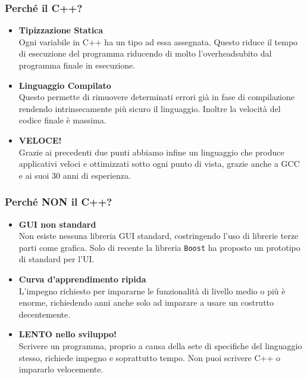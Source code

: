\documentclass[11pt]{beamer}
\begin{document}
\begin{frame}
\frametitle{Perché il C++?}
\begin{itemize}
	\pause
	\item \textbf{Tipizzazione Statica}\\
	Ogni variabile in C++ ha un tipo ad essa assegnata. Questo riduce il tempo di esecuzione del programma riducendo di molto l'overhead\footnotemark subito dal programma finale in esecuzione.
	\pause
	\item \textbf{Linguaggio Compilato} \\
	Questo permette di rimuovere determinati errori già in fase di compilazione rendendo intrinsecamente più sicuro il linguaggio. Inoltre la velocità del codice finale è massima.
	\pause
	\item \textbf{VELOCE!} \\
	Grazie ai precedenti due punti abbiamo infine un linguaggio che produce applicativi veloci e ottimizzati sotto ogni punto di vista, grazie anche a GCC e ai suoi 30 anni di esperienza.\footnotemark
\end{itemize}
\end{frame}

\begin{frame}
\frametitle{Perché NON il C++?}
\begin{itemize}
	\pause
	\item \textbf{GUI non standard}\\
	Non esiste nessuna libreria GUI standard, costringendo l'uso di librerie terze parti come grafica. Solo di recente la libreria \texttt{Boost} ha proposto un prototipo di standard per l'UI.\footnotemark
	\pause
	\item \textbf{Curva d'apprendimento ripida} \\
	L'impegno richiesto per impararne le funzionalità di livello medio o più è enorme, richiedendo anni anche solo ad imparare a usare un costrutto decentemente.
	\pause
	\item \textbf{LENTO nello sviluppo!} \\
	Scrivere un programma, proprio a causa della sete di specifiche del linguaggio stesso, richiede impegno e soprattutto tempo. Non puoi scrivere C++ o impararlo velocemente.
\end{itemize}
\end{frame}
\end{document}

